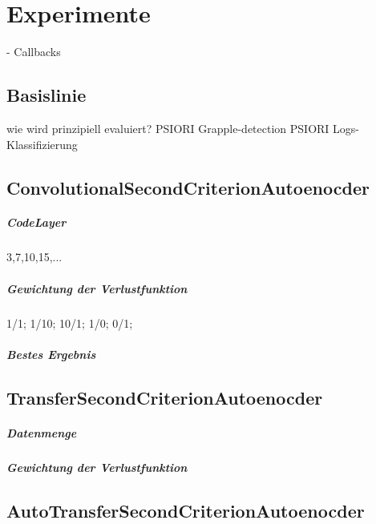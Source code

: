 \chapter{Experimente}
\label{chap:Experimente}

- Callbacks

	\section{Basislinie}
	\label{sec:Basislinie}
	wie wird prinzipiell evaluiert?
	PSIORI Grapple-detection
	PSIORI Logs-Klassifizierung
		
	\section{ConvolutionalSecondCriterionAutoenocder}
	\label{sec:ConvolutionalSecondCriterionAutoenocder}
			\paragraph{CodeLayer}
				3,7,10,15,...
			\paragraph{Gewichtung der Verlustfunktion}
			1/1; 1/10; 10/1; 1/0; 0/1;
			\paragraph{Bestes Ergebnis}
	\section{TransferSecondCriterionAutoenocder}
	\label{sec:TransferSecondCriterionAutoenocder}
			\paragraph{Datenmenge}
			\paragraph{Gewichtung der Verlustfunktion}
	\section{AutoTransferSecondCriterionAutoenocder}
	\label{sec:AutoTransferSecondCriterionAutoenocder}


		